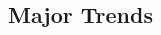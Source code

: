 \documentclass[10pt, plain]{../../metanetpaper}
\begin{document}
\begin{multicols}{2}


\subsection{Major Trends}
\label{sec:major-trends}



\end{multicols}
\end{document}
